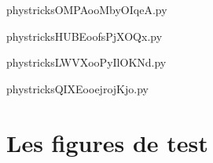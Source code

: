     

    \clearpage
    


    \newcommand{\CaptionFigOMPAooMbyOIqeA}{This is an automatically generated default caption; do not change.}
    \begin{center}
        
    \end{center}
    phystricksOMPAooMbyOIqeA.py

    

    \clearpage
    


    \newcommand{\CaptionFigHUBEoofsPjXOQx}{This is an automatically generated default caption; do not change.}
    \begin{center}
        
    \end{center}
    phystricksHUBEoofsPjXOQx.py

    

    \clearpage
    


    \newcommand{\CaptionFigLWVXooPyIlOKNd}{This is an automatically generated default caption; do not change.}
    \begin{center}
        
    \end{center}
    phystricksLWVXooPyIlOKNd.py

    

    \clearpage
    


    \newcommand{\CaptionFigQIXEooejrojKjo}{This is an automatically generated default caption; do not change.}
    \begin{center}
        
    \end{center}
    phystricksQIXEooejrojKjo.py

    

    \clearpage
    
\section{Les figures de test}



